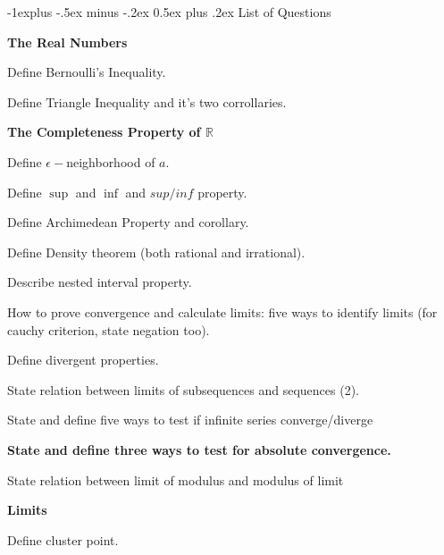\documentclass[10pt,landscape]{article}
\makeatletter
\renewcommand{\subsection}{\@startsection{subsection}{2}{0mm}%
                                {-1explus -.5ex minus -.2ex}%
                                {0.5ex plus .2ex}%
                                {\normalfont\normalsize\bfseries}}
\makeatother
\begin{document}
\begin{multicols}{4}


\subsection{List of Questions}

\textbf{The Real Numbers}

Define Bernoulli's Inequality.

Define Triangle Inequality and it's two corrollaries.

\textbf{The Completeness Property of $\mathbb{R}$}

Define $\epsilon-$neighborhood of $a$.

Define $\sup$ and $\inf$ and $sup/inf$ property.

Define Archimedean Property and corollary.

Define Density theorem (both rational and irrational).

Describe nested interval property.

How to prove convergence and calculate limits: five ways to identify limits (for cauchy criterion, state negation too).

Define divergent properties.

State relation between limits of subsequences and sequences (2).

State and define five ways to test if infinite series converge/diverge

\textbf{State and define three ways to test for absolute convergence.}

State relation between limit of modulus and modulus of limit

\textbf{Limits}

Define cluster point.


\end{multicols}
\end{document}
